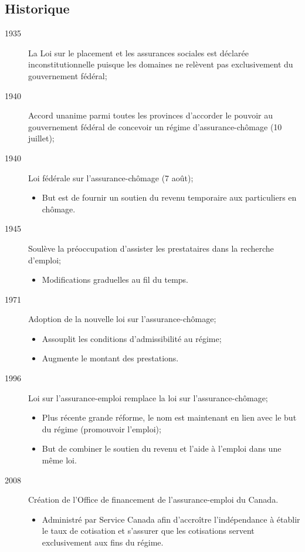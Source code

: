\documentclass[10pt, french]{article}
\begin{document}
\begin{multicols*}{3}
\subsection{Historique}
\begin{description}
	\item[1935]	La Loi sur le placement et les assurances sociales est déclarée inconstitutionnelle puisque les domaines ne relèvent pas exclusivement du gouvernement fédéral;
	\item[1940]	Accord unanime parmi toutes les provinces d'accorder le pouvoir au gouvernement fédéral de concevoir un régime d'assurance-chômage (10 juillet);
	\item[1940]	Loi \textcolor{bulgarianrose}{fédérale} sur l'assurance-chômage (7 août);
		\begin{itemize}[leftmargin =*]
		\item	But est de fournir un soutien du revenu temporaire aux particuliers en chômage.
		\end{itemize}
	\item[1945]	Soulève la préoccupation d'assister les prestataires dans la recherche d'emploi;
		\begin{itemize}[leftmargin =*]
		\item	Modifications graduelles au fil du temps.
		\end{itemize}
	\item[1971]	Adoption de la nouvelle loi sur l'assurance-chômage;
		\begin{itemize}[leftmargin =*]
		\item	Assouplit les conditions d'admissibilité au régime;
		\item	Augmente le montant des prestations.
		\end{itemize}
	\item[1996]	Loi sur l'assurance-emploi remplace la loi sur l'assurance-chômage;
		\begin{itemize}[leftmargin =*]
		\item	Plus récente grande réforme, le nom est maintenant en lien avec le but du régime (promouvoir l'emploi);
		\item	But de combiner le soutien du revenu et l'aide à l'emploi dans une même loi.
		\end{itemize}
	\item[2008]	Création de l'Office de financement de l'assurance-emploi du Canada.
		\begin{itemize}[leftmargin =*]
		\item	Administré par Service Canada afin d'accroître l'indépendance à établir le taux de cotisation et s'assurer que les cotisations servent exclusivement aux fins du régime.
		\end{itemize}
\end{description}



\end{multicols*}
\end{document}
